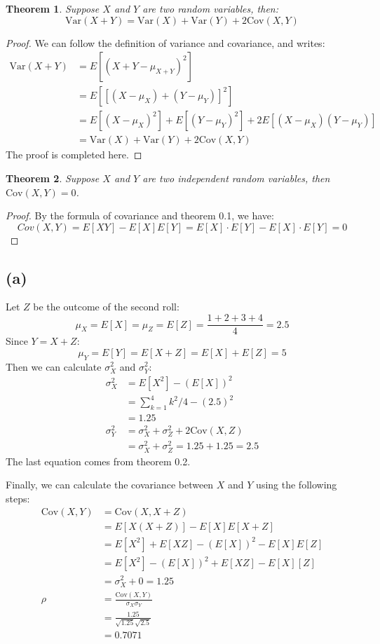 \documentclass[12pt]{article}
\newtheorem{theorem}{Theorem}[section]
\theoremstyle{definition}
\theoremstyle{remark}
\begin{document}
\begin{theorem}
    Suppose $X$ and $Y$ are two random variables, then:
    $$\mathrm{Var}(X+Y)=\mathrm{Var}(X)+\mathrm{Var}(Y)+2\mathrm{Cov}(X,Y)$$
\end{theorem}
\begin{proof}
We can follow the definition of variance and covariance, and writes:
\begin{align*}
    \mathrm{Var}(X+Y)&=E[(X+Y-\mu_{X+Y})^2] \\
    &=E[[(X-\mu_X)+(Y-\mu_Y)]^2] \\
    &=E[(X-\mu_X)^2]+E[(Y-\mu_Y)^2]+2E[(X-\mu_X)(Y-\mu_Y)] \\
    &=\mathrm{Var}(X)+\mathrm{Var}(Y)+2\mathrm{Cov}(X,Y)
\end{align*}
The proof is completed here.
\end{proof}
\begin{theorem}
    Suppose $X$ and $Y$ are two independent random variables, then $\mathrm{Cov}(X,Y)=0$.
\end{theorem}
\begin{proof}
By the formula of covariance and theorem 0.1, we have:
$$Cov(X,Y)=E[XY]-E[X]E[Y]=E[X]\cdot E[Y]-E[X]\cdot E[Y]=0$$
\end{proof}
\noindent\makebox[\linewidth]{\rule{\linewidth}{0.4pt}}
\subsection*{(a)}
Let $Z$ be the outcome of the second roll:
$$\mu_X=E[X]=\mu_Z=E[Z]=\frac{1+2+3+4}{4}=2.5$$
Since $Y=X+Z$:
$$\mu_Y=E[Y]=E[X+Z]=E[X]+E[Z]=5$$
Then we can calculate $\sigma_X^2$ and $\sigma_Y^2$:
\begin{align*}
    \sigma_X^2&=E[X^2]-(E[X])^2 \\
    &=\sum^4_{k=1}k^2/4-(2.5)^2 \\
    &=1.25 \\
    \sigma_Y^2&=\sigma_X^2+\sigma_Z^2+2\mathrm{Cov}(X,Z) \\
    &=\sigma_X^2+\sigma_Z^2=1.25+1.25=2.5
\end{align*}
The last equation comes from theorem 0.2.

Finally, we can calculate the covariance between $X$ and $Y$ using the following steps:
\begin{align*}
    \mathrm{Cov}(X,Y)&=\mathrm{Cov}(X,X+Z) \\
    &=E[X(X+Z)]-E[X]E[X+Z] \\
    &=E[X^2]+E[XZ]-(E[X])^2-E[X]E[Z] \\
    &=E[X^2]-(E[X])^2+E[XZ]-E[X][Z] \\
    &=\sigma_X^2+0=1.25 \\
    \rho&=\frac{\mathrm{Cov}(X,Y)}{\sigma_X\sigma_Y} \\
    &=\frac{1.25}{\sqrt{1.25}\sqrt{2.5}}\\
    &=0.7071
\end{align*}
\end{document}

